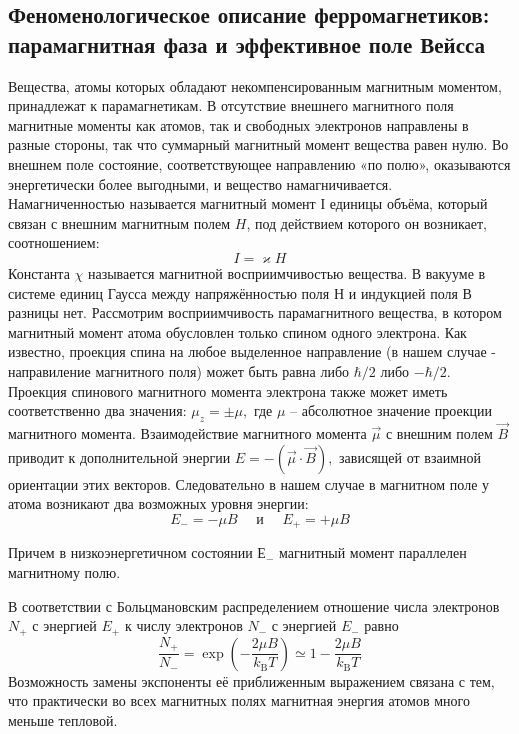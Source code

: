 \documentclass[a4paper, 12pt]{article}%
\begin{document}
\subsection{Феноменологическое описание ферромагнетиков: парамагнитная фаза и эффективное поле Вейсса}
Вещества, атомы которых обладают некомпенсированным магнитным моментом, принадлежат к парамагнетикам. В отсутствие внешнего магнитного поля магнитные моменты как атомов, так и свободных электронов направлены в разные стороны, так что суммарный магнитный момент вещества равен нулю. Во внешнем поле состояние, соответствующее направлению «по полю», оказываются энергетически более выгодными, и вещество намагничивается.
Намагниченностью называется магнитный момент $І$ единицы объёма, который связан с внешним магнитным полем $H$, под действием которого он возникает, соотношением:
$$
I = \varkappa H
$$
Константа $\chi$ называется магнитной восприимчивостью вещества. В вакууме в системе единиц Гаусса между напряжённостью поля $Н$ и индукцией поля В разницы нет.
Рассмотрим восприимчивость парамагнитного вещества, в котором магнитный момент атома обусловлен только спином одного электрона. Как известно, проекция спина на любое выделенное направление (в нашем случае - направиление магнитного поля) может быть равна либо $\hbar/2$ либо $-\hbar/2$. Проекция спинового магнитного момента электрона также может иметь соответственно два значения: $\mu_{z}= \pm \mu,$ где $\mu$ -- абсолютное значение проекции магнитного момента.
Взаимодействие магнитного момента $\vec{\mu}$ с внешним полем $\vec{B}$ приводит к дополнительной энергии $E=-\left(\vec{\mu} \cdot \vec{B}\right),$ зависящей от взаимной ориентации этих векторов. Следовательно в нашем случае в магнитном поле у атома возникают два возможных уровня энергии:
$$
E_{-}=-\mu B \quad \text { и } \quad E_{+}=+\mu B
$$

Причем в низкоэнергетичном состоянии $Е_-$ магнитный момент параллелен магнитному
полю.

В соответствии с Больцмановским распределением отношение числа электронов $N_{+}$ с 
энергией $E_{+}$ к числу электронов $N_-$ с энергией $E_-$ равно
$$
\frac{N_{+}}{N_{-}}=\exp \left(-\frac{2 \mu B}{k_{\mathrm{B}} T}\right) \simeq 1-\frac{2 \mu B}{k_{\mathrm{B}} T}
$$
Возможность замены экспоненты её приближенным выражением связана с тем, что
практически во всех магнитных полях магнитная энергия атомов много меньше
тепловой.
\end{document}
